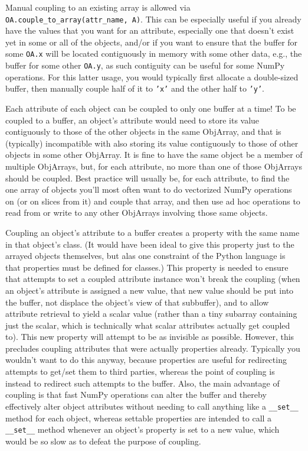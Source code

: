 \documentclass[letterpaper,compsoc,twoside]{IEEEtran}
\begin{document}
Manual coupling to an existing array is allowed via \texttt{OA.couple\_to\_array(attr\_name, A)}.   This can be especially useful if you already have the values that you want for an attribute, especially one that doesn't exist yet in some or all of the objects, and/or if you want to ensure that the buffer for some \texttt{OA.x} will be located contiguously in memory with some other data, e.g., the buffer for some other \texttt{OA.y}, as such contiguity can be useful for some NumPy operations. For this latter usage, you would typically first allocate a double-sized buffer, then manually couple half of it to \texttt{'x'} and the other half to \texttt{'y'}.

Each attribute of each object can be coupled to only one buffer at a time!  To be coupled to a buffer, an object's attribute would need to store its value contiguously to those of the other objects in the same ObjArray, and that is (typically) incompatible with also storing its value contiguously to those of other objects in some other ObjArray. It is fine to have the same object be a member of multiple ObjArrays, but, for each attribute, no more than one of those ObjArrays should be coupled.  Best practice will usually be, for each attribute, to find the one array of objects you'll most often want to do vectorized NumPy operations on (or on slices from it) and couple that array, and then use ad hoc operations to read from or write to any other ObjArrays involving those same objects.

Coupling an object's attribute to a buffer creates a property with the same name in that object's class. (It would have been ideal to give this property just to the arrayed objects themselves, but alas one constraint of the Python language is that properties must be defined for classes.) This property is needed to ensure that attempts to set a coupled attribute instance won't break the coupling (when an object's attribute is assigned a new value, that new value should be put into the buffer, not displace the object's view of that subbuffer), and to allow attribute retrieval to yield a scalar value (rather than a tiny subarray containing just the scalar, which is technically what scalar attributes actually get coupled to). This new property will attempt to be as invisible as possible.  However, this precludes coupling \textquotedbl{}attributes\textquotedbl{} that were actually properties already. Typically you wouldn't want to do this anyway, because properties are useful for redirecting attempts to get/set them to third parties, whereas the point of coupling is instead to redirect such attempts to the buffer.  Also, the main advantage of coupling is that fast NumPy operations can alter the buffer and thereby effectively alter object attributes without needing to call anything like a \texttt{\_\_set\_\_} method for each object, whereas settable properties are intended to call a \texttt{\_\_set\_\_} method whenever an object's property is set to a new value, which would be so slow as to defeat the purpose of coupling.
\end{document}
